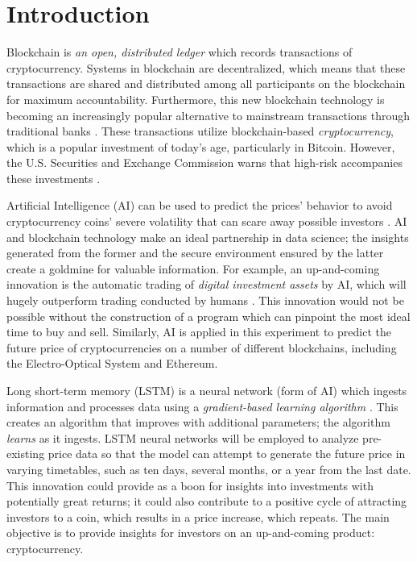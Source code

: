 
\section{Introduction}

Blockchain is {\em an open, distributed ledger} which records
transactions of cryptocurrency. Systems in blockchain are
decentralized, which means that these transactions are shared and
distributed among all participants on the blockchain for maximum
accountability. Furthermore, this new blockchain technology is
becoming an increasingly popular alternative to mainstream
transactions through traditional banks \cite{c2}. These transactions
utilize blockchain-based {\em cryptocurrency}, which is a popular
investment of today's age, particularly in Bitcoin. However, the
U.S. Securities and Exchange Commission warns that high-risk
accompanies these investments \cite{c1}.

Artificial Intelligence (AI) can be used to predict the prices'
behavior to avoid cryptocurrency coins' severe volatility that can
scare away possible investors \cite{c3}. AI and blockchain technology
make an ideal partnership in data science; the insights generated from
the former and the secure environment ensured by the latter create a
goldmine for valuable information. For example, an up-and-coming
innovation is the automatic trading of {\em digital investment assets}
by AI, which will hugely outperform trading conducted by humans
\cite{c5}. This innovation would not be possible without the
construction of a program which can pinpoint the most ideal time to
buy and sell. Similarly, AI is applied in this experiment to predict
the future price of cryptocurrencies on a number of different
blockchains, including the Electro-Optical System and Ethereum.

Long short-term memory (LSTM) is a neural network (form of AI) which
ingests information and processes data using a {\em gradient-based
  learning algorithm} \cite{c6}. This creates an algorithm that
improves with additional parameters; the algorithm {\em learns} as it
ingests. LSTM neural networks will be employed to analyze pre-existing
price data so that the model can attempt to generate the future price
in varying timetables, such as ten days, several months, or a year
from the last date. This innovation could provide as a boon for
insights into investments with potentially great returns; it could
also contribute to a positive cycle of attracting investors to a coin,
which results in a price increase, which repeats. The main objective
is to provide insights for investors on an up-and-coming product:
cryptocurrency.

